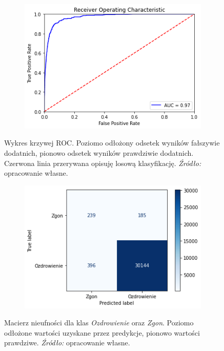 \documentclass[polish, twoside, 12pt, a4paper]{article}
\theoremstyle{definition}
\theoremstyle{plain}
\theoremstyle{remark}
\begin{document}
\begin{figure}[H]
  \centering
  \begin{subfigure}[t]{\textwidth}
	\centering
    \includegraphics[width=10cm]{roc.png}
  \end{subfigure}
  \captionsetup{margin=10pt,font=small,labelfont=bf,width=.8\textwidth}
  \caption{Wykres krzywej ROC. Poziomo odłożony odsetek wyników fałszywie dodatnich, pionowo odsetek wyników prawdziwie dodatnich. Czerwona linia przerywana opisuję losową klasyfikację. \textit{Źródło:} opracowanie własne.}
\end{figure}


\begin{figure}[H]
  \centering
  \begin{subfigure}[t]{\textwidth}
	\centering
    \includegraphics[width=10cm]{conf_matrix.png}
  \end{subfigure}
  \captionsetup{margin=10pt,font=small,labelfont=bf,width=.8\textwidth}
  \caption{Macierz nieufności dla klas \emph{Ozdrowienie} oraz \emph{Zgon}. Poziomo odłożone wartości uzyskane przez predykcje, pionowo wartości prawdziwe. \textit{Źródło:} opracowanie własne.}
\end{figure}
\end{document}
